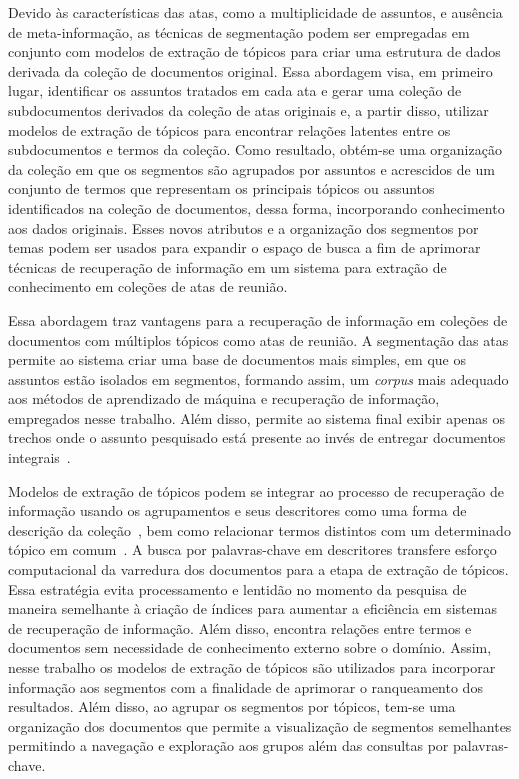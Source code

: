 Devido às características das atas, como a multiplicidade de assuntos, e ausência de meta-informação, as técnicas de segmentação podem ser empregadas em conjunto com modelos de extração de tópicos para criar uma estrutura de dados derivada da coleção de documentos original. 
Essa abordagem visa, em primeiro lugar, identificar os assuntos tratados em cada ata e gerar uma coleção de subdocumentos derivados da coleção de atas originais e, a partir disso, utilizar modelos de extração de tópicos para encontrar relações latentes entre os subdocumentos e termos da coleção.
Como resultado, obtém-se uma organização da coleção em que os segmentos são agrupados por assuntos e acrescidos de um conjunto de termos que representam os principais tópicos ou assuntos identificados na coleção de documentos, dessa forma, incorporando conhecimento aos dados originais. Esses novos atributos e a organização dos segmentos por temas podem ser usados para 
expandir o espaço de busca a fim de aprimorar técnicas de recuperação de informação em um sistema para extração de conhecimento em coleções de atas de reunião.




Essa abordagem traz vantagens para a recuperação de informação em coleções de documentos com múltiplos tópicos como atas de reunião.
A segmentação das atas permite ao sistema criar uma base de documentos mais simples, em que os assuntos estão isolados em segmentos, formando assim, um \textit{corpus} mais adequado aos métodos de aprendizado de máquina e recuperação de informação, empregados nesse trabalho. Além disso, permite ao sistema final exibir apenas os trechos onde o assunto pesquisado está presente ao invés de entregar documentos integrais~\cite{Tagarelli2013, Jeong:2010, Prince2007, Huang2003}. 

Modelos de extração de tópicos podem se integrar ao processo de recuperação de informação usando os agrupamentos e seus descritores como uma forma de descrição da coleção~\cite{Zhai2017, Xing2009}, bem como relacionar termos distintos com um determinado tópico em comum~\cite{WEIXING}. A busca por palavras-chave em descritores transfere esforço computacional da varredura dos documentos para a etapa de extração de tópicos. Essa estratégia evita processamento e lentidão no momento da pesquisa de maneira semelhante à criação de índices para aumentar a eficiência em sistemas de recuperação de informação. Além disso, encontra relações entre termos e documentos sem necessidade de conhecimento externo sobre o domínio. Assim, nesse trabalho os modelos de extração de tópicos são utilizados para incorporar informação aos segmentos com a finalidade de aprimorar o ranqueamento dos resultados. 
% 
Além disso, ao agrupar os segmentos por tópicos, tem-se uma organização dos documentos que permite a visualização de segmentos semelhantes permitindo a navegação e exploração aos grupos além das consultas por palavras-chave.
%



